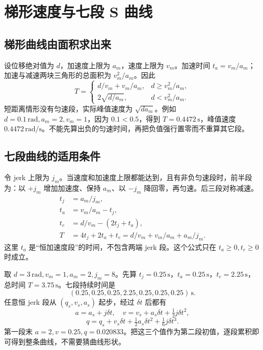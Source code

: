 \section{梯形速度与七段 S 曲线}

\subsection{梯形曲线由面积求出来}

设位移绝对值为 $d$，加速度上限为 $a_m$，速度上限为 $v_m$。加速时间 $t_a=v_m/a_m$；加速与减速两块三角形的总面积为 $v_m^2/a_m$。因此
\begin{equation}
T=\begin{cases}
d/v_m+v_m/a_m,&d\ge v_m^2/a_m,\\
2\sqrt{d/a_m},&d<v_m^2/a_m.
\end{cases}
\end{equation}
短距离情形没有匀速段，实际峰值速度为 $\sqrt{da_m}$。例如 $d=0.1\,\mathrm{rad},a_m=2,v_m=1$，因为 $0.1<0.5$，得到 $T=0.4472\,\mathrm{s}$，峰值速度 $0.4472\,\mathrm{rad/s}$。不能先算出负的匀速时间，再把负值强行置零而不重算其它段。

\subsection{七段曲线的适用条件}

令 jerk 上限为 $j_m$。当速度和加速度上限都能达到，且有非负匀速段时，前半段为：以 $+j_m$ 增加加速度、保持 $a_m$、以 $-j_m$ 降回零，再匀速。后三段对称减速。
\begin{align}
t_j&=a_m/j_m,\\
t_a&=v_m/a_m-t_j,\\
t_c&=d/v_m-(2t_j+t_a),\\
T&=4t_j+2t_a+t_c=d/v_m+v_m/a_m+a_m/j_m.
\end{align}
这里 $t_a$ 是“恒加速度段”的时间，不包含两端 jerk 段。这个公式只在 $t_a\ge0,t_c\ge0$ 时成立。

\begin{examplebox}[七段曲线的逐段时间]
取 $d=3\,\mathrm{rad},v_m=1,a_m=2,j_m=8$。先算 $t_j=0.25\,\mathrm{s}$，$t_a=0.25\,\mathrm{s}$，$t_c=2.25\,\mathrm{s}$，总时间 $T=3.75\,\mathrm{s}$。七段持续时间是
\[
(0.25,0.25,0.25,2.25,0.25,0.25,0.25)\,\mathrm{s}.
\]
任意恒 jerk 段从 $(q_s,v_s,a_s)$ 起步，经过 $\delta t$ 后都有
\[
a=a_s+j\delta t,\quad v=v_s+a_s\delta t+\tfrac12j\delta t^2,
\]
\[
q=q_s+v_s\delta t+\tfrac12a_s\delta t^2+\tfrac16j\delta t^3.
\]
第一段末 $a=2,v=0.25,q=0.020833$。把这三个值作为第二段初值，逐段累积即可得到整条曲线，不需要猜曲线形状。
\end{examplebox}

